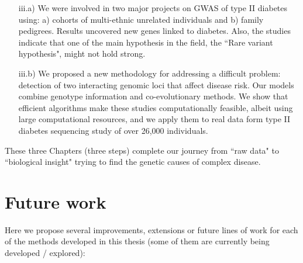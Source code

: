 \begin{itemize}
	\begin{itemize}
	\item[iii.a)] We were involved in two major projects on GWAS of type II diabetes using: a) cohorts of multi-ethnic unrelated individuals and b) family pedigrees. Results uncovered new genes linked to diabetes. Also, the studies indicate that one of the main hypothesis in the field, the ``Rare variant hypothesis", might not hold strong.
	
	\item[iii.b)] We proposed a new methodology for addressing a difficult problem: detection of two interacting genomic loci that affect disease risk. Our models combine genotype information and co-evolutionary methods. We show that efficient algorithms make these studies computationally feasible, albeit using large computational resources, and we apply them to real data form type II diabetes sequencing study of over 26,000 individuals.
	\end{itemize}
\end{itemize}

These three Chapters (three steps) complete our journey from ``raw data" to ``biological insight" trying to find the genetic causes of complex disease.

\section{Future work}

Here we propose several improvements, extensions or future lines of work for each of the methods developed in this thesis (some of them are currently being developed / explored): \\


